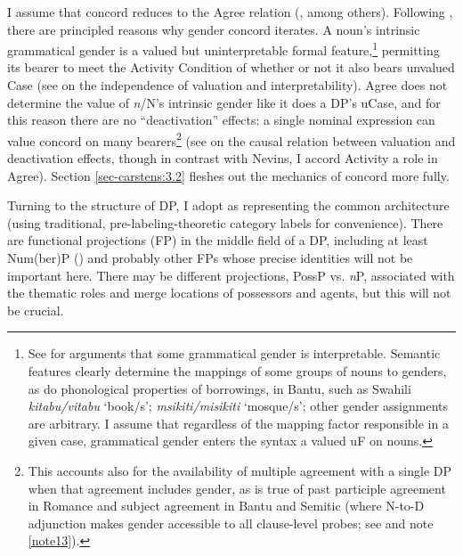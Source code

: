 \documentclass[output=paper
,modfonts
,nonflat]{langsci/langscibook}
\begin{document}
I assume that concord reduces to the Agree relation (\citealt{Carstens2000,Koopman2006,Baker2008a,Danon2011,Toosarvandani_Van_Urk2014}, among others). Following \citet{Carstens2010, Carstens2011}, there are principled reasons why gender concord iterates. A noun's intrinsic grammatical gender is a valued but uninterpretable formal feature,\footnote{See \citet{Kramer2015} for arguments that some grammatical gender is interpretable. Semantic features clearly determine the mappings of some groups of nouns to genders, as do phonological properties of borrowings, in Bantu, such as Swahili \textit{kitabu/vitabu} `book/s'; \textit{msikiti/misikiti} `mosque/s'; other gender assignments are arbitrary. I assume that regardless of the mapping factor responsible in a given case, grammatical gender enters the syntax a valued uF on nouns.} permitting its bearer to meet the Activity Condition of \citet{Chomsky2001} whether or not it also bears unvalued Case (see \citealt{Pesetsky_Torrego2007} on the independence of valuation and interpretability). Agree does not determine the value of \textit{n}/N’s intrinsic gender like it does a DP's uCase, and for this reason there are no ``deactivation'' effects: a single nominal expression can value concord on many bearers\footnote{\label{fn:6}This accounts also for the availability of multiple agreement with a single DP when that agreement includes gender, as is true of past participle agreement in Romance and subject agreement in Bantu and Semitic (where N-to-D adjunction makes gender accessible to all clause-level probes; see \citealt{Carstens2011} and note \ref{note13}).} (see \citealt{Nevins2005} on the causal relation between valuation and deactivation effects, though in contrast with Nevins, I accord Activity a role in Agree). Section \ref{sec-carstens:3.2} fleshes out the mechanics of concord more fully.

Turning to the structure of DP, I adopt  as representing the common architecture (using traditional, pre-labeling-theoretic category labels for convenience). There are functional projections (FP) in the middle field of a DP, including at least Num(ber)P (\citealt{Carstens1991,Ritter1991, Ritter1992}) and probably other FPs whose precise identities will not be important here. There may be different projections, PossP vs. \textit{n}P, associated with the thematic roles and merge locations of possessors and agents, but this will not be crucial.
\end{document}
